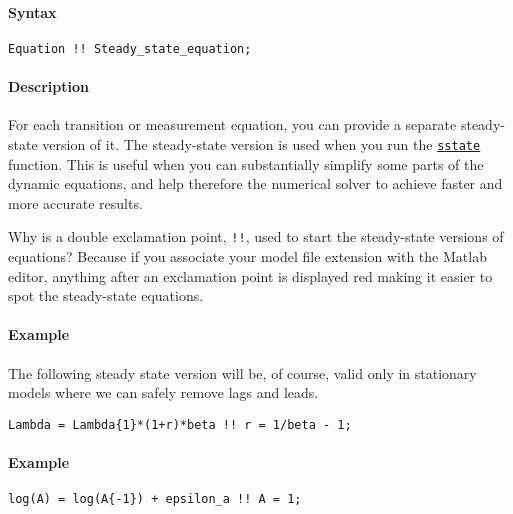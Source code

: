 


	\paragraph{Syntax}

\begin{verbatim}
Equation !! Steady_state_equation;
\end{verbatim}

\paragraph{Description}

For each transition or measurement equation, you can provide a separate
steady-state version of it. The steady-state version is used when you
run the \href{model/sstate}{\texttt{sstate}} function. This is useful
when you can substantially simplify some parts of the dynamic equations,
and help therefore the numerical solver to achieve faster and more
accurate results.

Why is a double exclamation point, \texttt{!!}, used to start the
steady-state versions of equations? Because if you associate your model
file extension with the Matlab editor, anything after an exclamation
point is displayed red making it easier to spot the steady-state
equations.

\paragraph{Example}

The following steady state version will be, of course, valid only in
stationary models where we can safely remove lags and leads.

\begin{verbatim}
Lambda = Lambda{1}*(1+r)*beta !! r = 1/beta - 1;
\end{verbatim}

\paragraph{Example}

\begin{verbatim}
log(A) = log(A{-1}) + epsilon_a !! A = 1;
\end{verbatim}


